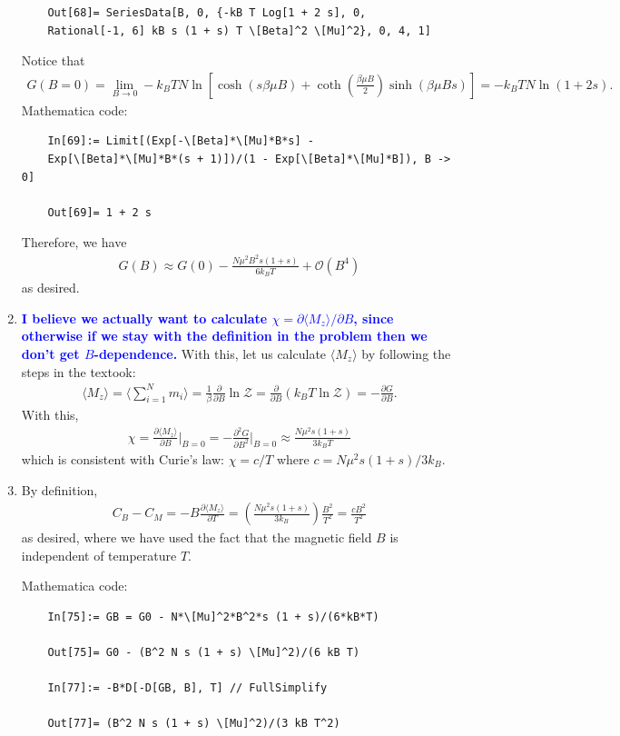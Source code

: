 \documentclass{article}
\theoremstyle{definition}
\newcommand{\p}{\partial}
\newcommand{\be}{\beta}
\newcommand{\f}[2]{\frac{#1}{#2}}
\newcommand{\lp}{\left(}
\newcommand{\rp}{\right)}
\newcommand{\lb}{\left[}
\newcommand{\rb}{\right]}
\begin{document}
\begin{enumerate}[label=(\alph*)]
\begin{lstlisting}
	Out[68]= SeriesData[B, 0, {-kB T Log[1 + 2 s], 0, 
	Rational[-1, 6] kB s (1 + s) T \[Beta]^2 \[Mu]^2}, 0, 4, 1]
	\end{lstlisting}
	
	Notice that
	\begin{align*}
	G(B=0) = \lim_{B \to 0} -k_B T N\ln \lb \cosh(s \be\mu B) + \coth(\f{\be\mu B}{2})\sinh(\be\mu B s) \rb = -k_B T N\ln (1+2s).
	\end{align*}
	Mathematica code:
	\begin{lstlisting}
	In[69]:= Limit[(Exp[-\[Beta]*\[Mu]*B*s] - 
	Exp[\[Beta]*\[Mu]*B*(s + 1)])/(1 - Exp[\[Beta]*\[Mu]*B]), B -> 0]
	
	Out[69]= 1 + 2 s
	\end{lstlisting}
	
	Therefore, we have
	\begin{align*}
	\boxed{G(B) \approx G(0) - \f{N \mu^2 B^2 s(1+s) }{6 k_BT} + \mathcal{O}(B^4)}
	\end{align*}
	as desired. 
	
	
	\item \textbf{\textcolor{blue}{I believe we actually want to calculate $\chi = \p \langle M_z \rangle / \p B$, since otherwise if we stay with the definition in the problem then we don't get $B$-dependence.}} With this, let us calculate $\langle M_z \rangle$ by following the steps in the textook:
	\begin{align*}
	\langle M_z \rangle = \bigg\langle \sum_{i=1}^N m_i \bigg\rangle   = \f{1}{\be}\f{\p}{\p B}\ln \mathcal{Z} = \f{\p}{\p B} (k_BT \ln\mathcal{Z}) = -\f{\p G}{\p B}.
	\end{align*}
	With this, 
	\begin{align*}
	\chi = \f{\p \langle M_z \rangle}{\p B}\bigg\vert_{B=0} = -\f{\p^2 G}{\p B^2}\bigg\vert_{B=0} \approx \boxed{\f{N\mu^2s(1+s)}{3k_BT}}
	\end{align*}
	which is consistent with Curie's law: $\chi = c/T$ where $c = N\mu^2s(1+s)/3k_B$.
	
	\item By definition, 
	\begin{align*}
	C_B - C_M = -B\f{\p \langle M_z\rangle}{\p T}  = \lp \f{N \mu^2 s(1+s)}{3k_B} \rp \f{B^2}{T^2} = \f{cB^2}{T^2}
	\end{align*}
	as desired, where we have used the fact that the magnetic field $B$ is independent of temperature $T$. 
	
	Mathematica code:
	\begin{lstlisting}
	In[75]:= GB = G0 - N*\[Mu]^2*B^2*s (1 + s)/(6*kB*T)
	
	Out[75]= G0 - (B^2 N s (1 + s) \[Mu]^2)/(6 kB T)
	
	In[77]:= -B*D[-D[GB, B], T] // FullSimplify
	
	Out[77]= (B^2 N s (1 + s) \[Mu]^2)/(3 kB T^2)
	\end{lstlisting}
\end{enumerate}
\end{document}
